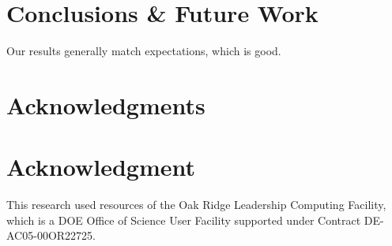\documentclass[conference,compsoc]{IEEEtran}
\begin{document}





%
%
%
%


\section{Conclusions \& Future Work}

Our results generally match expectations, which is good.


\ifCLASSOPTIONcompsoc
  \section*{Acknowledgments}
\else
  \section*{Acknowledgment}
\fi

This research used resources of the Oak Ridge Leadership Computing Facility, 
which is a DOE Office of Science User Facility supported under Contract DE-AC05-00OR22725.
\end{document}
